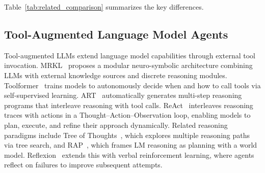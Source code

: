 Table~\ref{tab:related_comparison} summarizes the key differences.

\begin{table}[t]
\centering
\caption{Comparison of self-corrective RAG approaches. \ours{} uniquely combines multi-tool agentic refinement with declarative pipeline optimization.}
\label{tab:related_comparison}
\end{table}

\subsection{Tool-Augmented Language Model Agents}
\label{subsec:rw_agents}

Tool-augmented LLMs extend language model capabilities through external tool invocation.
MRKL~\cite{karpas2022mrkl} proposes a modular neuro-symbolic architecture combining LLMs with external knowledge sources and discrete reasoning modules.
Toolformer~\cite{schick2023toolformer} trains models to autonomously decide when and how to call tools via self-supervised learning.
ART~\cite{paranjape2023art} automatically generates multi-step reasoning programs that interleave reasoning with tool calls.
ReAct~\cite{yao2023react} interleaves reasoning traces with actions in a Thought--Action--Observation loop, enabling models to plan, execute, and refine their approach dynamically.
Related reasoning paradigms include Tree of Thoughts~\cite{yao2023tree}, which explores multiple reasoning paths via tree search, and RAP~\cite{hao2023reasoning}, which frames LM reasoning as planning with a world model.
Reflexion~\cite{shinn2023reflexion} extends this with verbal reinforcement learning, where agents reflect on failures to improve subsequent attempts.


